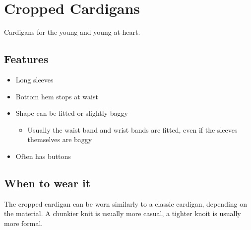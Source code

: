 \documentclass[
  openany]{book}
\providecommand{\tightlist}{%
  \setlength{\itemsep}{0pt}\setlength{\parskip}{0pt}}
\begin{document}
\hypertarget{cropped-cardigans}{%
\chapter{Cropped Cardigans}\label{cropped-cardigans}}

Cardigans for the young and young-at-heart.

\hypertarget{features-1}{%
\section{Features}\label{features-1}}

\begin{itemize}
\tightlist
\item
  Long sleeves
\item
  Bottom hem stops at waist
\item
  Shape can be fitted or slightly baggy

  \begin{itemize}
  \tightlist
  \item
    Usually the waist band and wrist bands are fitted, even if the sleeves themselves are baggy
  \end{itemize}
\item
  Often has buttons
\end{itemize}

\hypertarget{when-to-wear-it-1}{%
\section{When to wear it}\label{when-to-wear-it-1}}

The cropped cardigan can be worn similarly to a classic cardigan, depending on the material. A chunkier knit is usually more casual, a tighter knoit is usually more formal.
\end{document}
